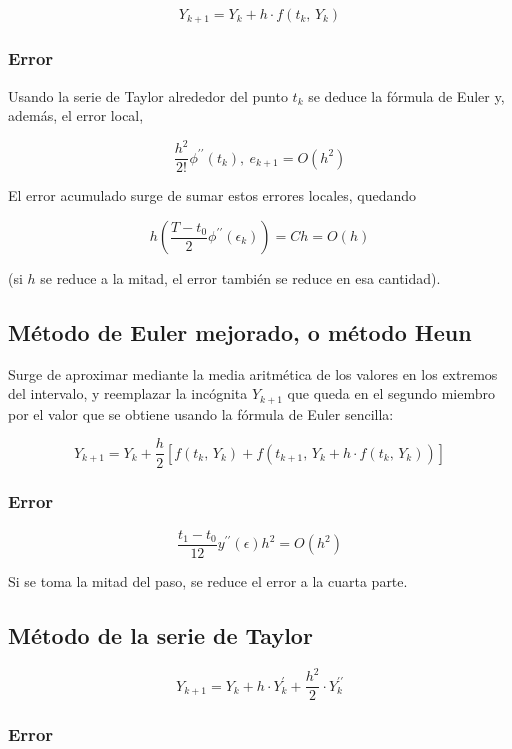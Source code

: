 \documentclass{article}
\begin{document}
\[ Y_{k+1} = Y_{k} + h \cdot f(t_k,\, Y_k) \]

\subsubsection{Error}

Usando la serie de Taylor alrededor del punto $t_k$ se deduce la fórmula de 
Euler y, además, el error local,

\[ \frac{h^2}{2!} \phi^{\prime\prime}(t_k),\ e_{k+1} = O(h^2) \]

El error acumulado surge de sumar estos errores locales, quedando 

\[ h \left( \frac{T-t_0}{2} \phi^{\prime\prime}(\epsilon_k) \right) 
    = Ch = O(h) \]

(si $h$ se reduce a la mitad, el error también se reduce en esa cantidad).

\subsection{Método de Euler mejorado, o método Heun}

Surge de aproximar mediante la media aritmética de los valores en los extremos
del intervalo, y reemplazar la incógnita $Y_{k+1}$ que queda en el segundo 
miembro por el valor que se obtiene usando la fórmula de Euler sencilla:

\[
    Y_{k+1} = Y_k + \frac{h}{2}\left[ f(t_k,\,Y_k) + f(t_{k+1},\, 
    Y_k + h \cdot f(t_k,\, Y_k)) \right]
\]

\subsubsection{Error}

\[
    \frac{t_1 - t_0}{12} y^{\prime\prime} (\epsilon) h^2 = O(h^2)
\]

Si se toma la mitad del paso, se reduce el error a la cuarta parte.

\subsection{Método de la serie de Taylor}

\[
    Y_{k+1} = Y_k + h \cdot Y^\prime_k + \frac{h^2}{2}\cdot Y^{\prime\prime}_k
\]

\subsubsection{Error}
\end{document}
